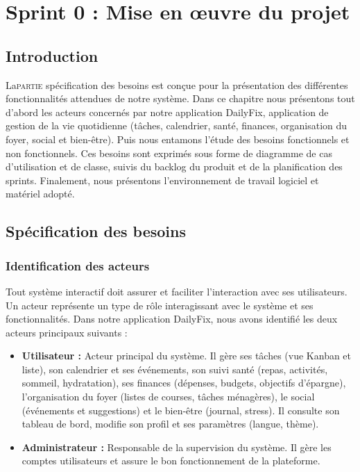 
\chapter{Sprint 0 : Mise en œuvre du projet}
\minitoc

\renewcommand{\headrulewidth}{1pt}
\fancyhead[C]{} 
\fancyhead[L]{\leftmark}
\fancyhead[R]{}

\renewcommand{\footrulewidth}{1pt}
\fancyfoot[L]{}
\fancyfoot[C]{\thepage}
\fancyfoot[R]{}

\newpage
\section{Introduction}

\lettrine[lines=2]{La}{partie} spécification des besoins est conçue pour la présentation des différentes fonctionnalités attendues de notre système. Dans ce chapitre nous présentons tout d'abord les acteurs concernés par notre application DailyFix, application de gestion de la vie quotidienne (tâches, calendrier, santé, finances, organisation du foyer, social et bien-être). Puis nous entamons l'étude des besoins fonctionnels et non fonctionnels. Ces besoins sont exprimés sous forme de diagramme de cas d'utilisation et de classe, suivis du backlog du produit et de la planification des sprints. Finalement, nous présentons l'environnement de travail logiciel et matériel adopté.

\section{Spécification des besoins}

\subsection{Identification des acteurs}
Tout système interactif doit assurer et faciliter l'interaction avec ses utilisateurs. Un acteur représente un type de rôle interagissant avec le système et ses fonctionnalités. Dans notre application DailyFix, nous avons identifié les deux acteurs principaux suivants :

\begin{itemize}
  \item \textbf{Utilisateur :} Acteur principal du système. Il gère ses tâches (vue Kanban et liste), son calendrier et ses événements, son suivi santé (repas, activités, sommeil, hydratation), ses finances (dépenses, budgets, objectifs d'épargne), l'organisation du foyer (listes de courses, tâches ménagères), le social (événements et suggestions) et le bien-être (journal, stress). Il consulte son tableau de bord, modifie son profil et ses paramètres (langue, thème).

  \item \textbf{Administrateur :} Responsable de la supervision du système. Il gère les comptes utilisateurs et assure le bon fonctionnement de la plateforme.
\end{itemize}

